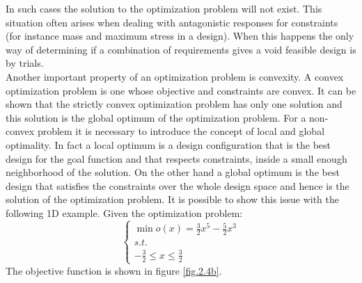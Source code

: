 In such cases the solution to the optimization problem will not exist. This situation often arises when dealing with antagonistic responses for constraints (for instance mass and maximum stress in a design). When this happens the only way of determining if a combination of requirements gives a void feasible design is by trials.\\
Another important property of an optimization problem is convexity.
A convex optimization problem is one whose objective and constraints are convex. It can be shown that the strictly convex optimization problem has only one solution and this solution is the global optimum of the optimization problem. For a non-convex problem it is necessary to introduce the concept of local and global optimality. In fact a local optimum is a design configuration that is the best design for the goal function and that respects constraints, inside a small enough neighborhood of the solution. On the other hand a global optimum is the best design that satisfies the constraints over the whole design space and hence is the solution of the optimization problem.
It is possible to show this issue with the following 1D example. 
Given the optimization problem:
\begin{equation}
\label{example_problem}
\begin{cases}
\min o(x)=\frac{3}{2}x^5-\frac{5}{2}x^3\\
s.t.\\
-\frac{3}{2}\leq x \leq \frac{3}{2}
\end{cases}
\end{equation}
The objective function is shown in figure \ref{fig.2.4b}.
